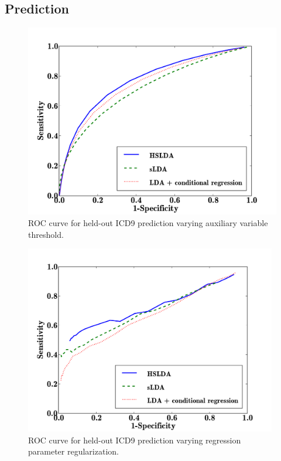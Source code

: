 \documentclass[portrait]{sciposter}
\begin{document}
\begin{multicols}{3}
\subsection{Prediction}

\begin{figure}
\centering
\includegraphics[width=25cm]{ROC_comparison_leafs}
\small{\caption{ROC curve for held-out ICD9 prediction varying auxiliary variable threshold.}}
\label{ICD9_aux_results}
\end{figure}

\begin{multicols}{2}

\begin{figure}
\centering
\includegraphics[width=11cm]{clin_pred_varying_mu}
\small{\caption{ROC curve for held-out ICD9 prediction varying regression parameter regularization.}}
\label{ICD9_mu_results}
\end{figure}



\end{multicols}
\end{multicols}
\end{document}
